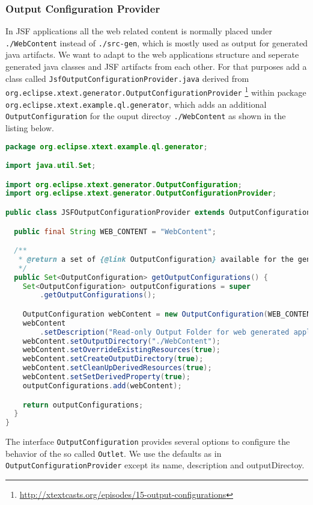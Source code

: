 \subsubsection{Output Configuration Provider}
\label{sec:outputConfigurationProvider}

In JSF applications all the web related content is normally placed under
\texttt{./WebContent} instead of \texttt{./src-gen}, which is mostly used as
output for generated java artifacts. We want to adapt to the web applications
structure and seperate generated java classes and JSF artifacts from each other. For that purposes add
a class called \texttt{JsfOutputConfigurationProvider.java} derived from
\texttt{org.eclipse.xtext.generator.OutputConfigurationProvider} 
\footnote{\url{http://xtextcasts.org/episodes/15-output-configurations}} within package
\texttt{org.eclipse.xtext.example.ql.generator}, which
adds an additional \texttt{OutputConfiguration} for the ouput directoy
\texttt{./WebContent} as shown in the listing below.

\begin{lstlisting}[language=Java]
package org.eclipse.xtext.example.ql.generator;

import java.util.Set;

import org.eclipse.xtext.generator.OutputConfiguration;
import org.eclipse.xtext.generator.OutputConfigurationProvider;

public class JSFOutputConfigurationProvider extends OutputConfigurationProvider {

  public final String WEB_CONTENT = "WebContent";

  /**
   * @return a set of {@link OutputConfiguration} available for the generator
   */
  public Set<OutputConfiguration> getOutputConfigurations() {
    Set<OutputConfiguration> outputConfigurations = super
        .getOutputConfigurations();

    OutputConfiguration webContent = new OutputConfiguration(WEB_CONTENT);
    webContent
        .setDescription("Read-only Output Folder for web generated application artifacts");
    webContent.setOutputDirectory("./WebContent");
    webContent.setOverrideExistingResources(true);
    webContent.setCreateOutputDirectory(true);
    webContent.setCleanUpDerivedResources(true);
    webContent.setSetDerivedProperty(true);
    outputConfigurations.add(webContent);

    return outputConfigurations;
  }
}
\end{lstlisting}

The interface \texttt{OutputConfiguration} provides several options to configure
the behavior of the so called \texttt{Outlet}. We use the defaults as in
\texttt{OutputConfigurationProvider} except its name, description and outputDirectoy.

